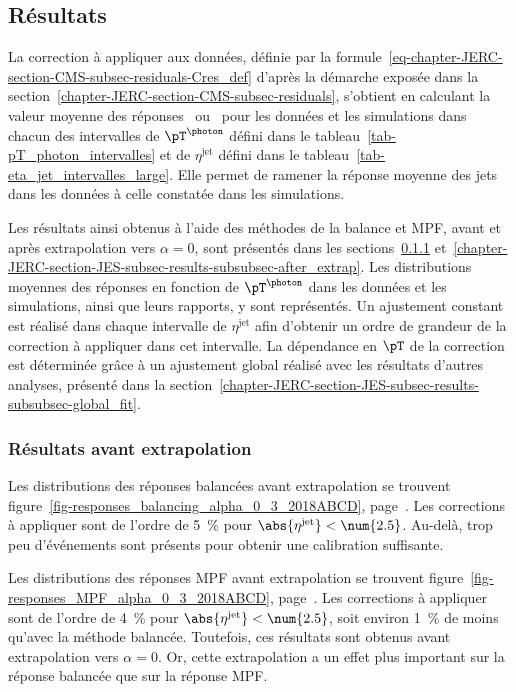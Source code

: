 \subsection{Résultats}\label{chapter-JERC-section-JES-subsec-results}
La correction à appliquer aux données, définie par la formule~\eqref{eq-chapter-JERC-section-CMS-subsec-residuals-Cres_def} d'après la démarche exposée dans la section~\ref{chapter-JERC-section-CMS-subsec-residuals}, s'obtient en calculant la valeur moyenne des réponses \Rbal\ ou \RMPF\ pour les données et les simulations dans chacun des intervalles
de $\pT^{\photon}$ défini dans le tableau~\ref{tab-pT_photon_intervalles} et
de $\eta^\text{jet}$ défini dans le tableau~\ref{tab-eta_jet_intervalles_large}.
Elle permet de ramener la réponse moyenne des jets dans les données à celle constatée dans les simulations.
\par Les résultats ainsi obtenus à l'aide des méthodes de la balance et MPF, avant et après extrapolation vers $\alpha=0$, sont présentés dans les sections~\ref{chapter-JERC-section-JES-subsec-results-subsubsec-before_extrap} et~\ref{chapter-JERC-section-JES-subsec-results-subsubsec-after_extrap}.
Les distributions moyennes des réponses en fonction de $\pT^{\photon}$ dans les données et les simulations, ainsi que leurs rapports, y sont représentés.
Un ajustement constant est réalisé dans chaque intervalle de $\eta^\text{jet}$ afin d'obtenir un ordre de grandeur de la correction à appliquer dans cet intervalle.
La dépendance en $\pT$ de la correction est déterminée grâce à un ajustement global réalisé avec les résultats d'autres analyses, présenté dans la section~\ref{chapter-JERC-section-JES-subsec-results-subsubsec-global_fit}.
\subsubsection{Résultats avant extrapolation}\label{chapter-JERC-section-JES-subsec-results-subsubsec-before_extrap}
\par Les distributions des réponses balancées avant extrapolation se trouvent figure~\ref{fig-responses_balancing_alpha_0_3_2018ABCD}, page~\pageref{fig-responses_balancing_alpha_0_3_2018ABCD}.
Les corrections à appliquer sont de l'ordre de \SI{5}{\%} pour $\abs{\eta^\text{jet}} < \num{2.5}$.
Au-delà, trop peu d'événements sont présents pour obtenir une calibration suffisante.
\par Les distributions des réponses MPF avant extrapolation se trouvent figure~\ref{fig-responses_MPF_alpha_0_3_2018ABCD}, page~\pageref{fig-responses_MPF_alpha_0_3_2018ABCD}.
Les corrections à appliquer sont de l'ordre de \SI{4}{\%} pour $\abs{\eta^\text{jet}} < \num{2.5}$, soit environ \SI{1}{\%} de moins qu'avec la méthode balancée.
Toutefois, ces résultats sont obtenus avant extrapolation vers $\alpha=0$. Or, cette extrapolation a un effet plus important sur la réponse balancée que sur la réponse MPF.
